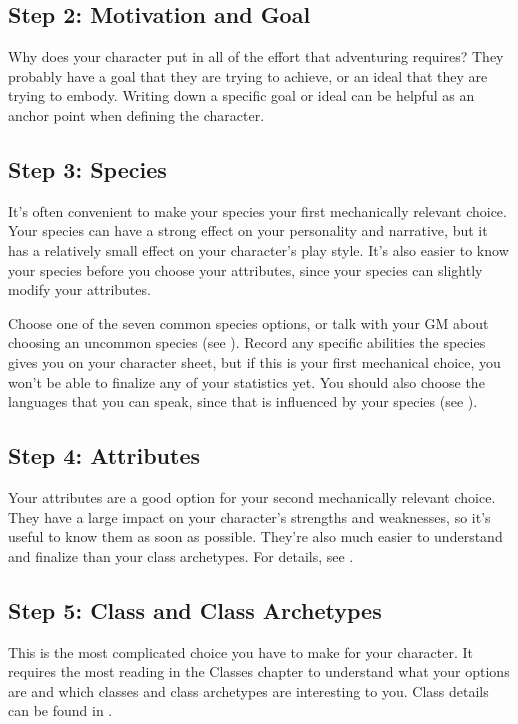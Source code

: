    \subsection{Step 2: Motivation and Goal}
        Why does your character put in all of the effort that adventuring requires?
        They probably have a goal that they are trying to achieve, or an ideal that they are trying to embody.
        Writing down a specific goal or ideal can be helpful as an anchor point when defining the character.

    \subsection{Step 3: Species}
        It's often convenient to make your species your first mechanically relevant choice.
        Your species can have a strong effect on your personality and narrative, but it has a relatively small effect on your character's play style.
        It's also easier to know your species before you choose your attributes, since your species can slightly modify your attributes.

        Choose one of the seven common species options, or talk with your GM about choosing an uncommon species (see ).
        Record any specific abilities the species gives you on your character sheet, but if this is your first mechanical choice, you won't be able to finalize any of your statistics yet.
        You should also choose the languages that you can speak, since that is influenced by your species (see ).

    \subsection{Step 4: Attributes}
        Your attributes are a good option for your second mechanically relevant choice.
        They have a large impact on your character's strengths and weaknesses, so it's useful to know them as soon as possible.
        They're also much easier to understand and finalize than your class archetypes.
        For details, see .

    \subsection{Step 5: Class and Class Archetypes}
        This is the most complicated choice you have to make for your character.
        It requires the most reading in the Classes chapter to understand what your options are and which classes and class archetypes are interesting to you.
        Class details can be found in .

